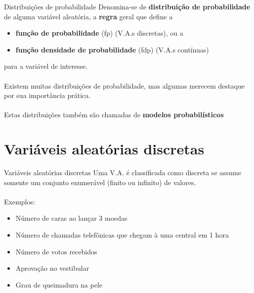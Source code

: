 \documentclass[10pt]{beamer}\usepackage[]{graphicx}\usepackage[]{color}
\theoremstyle{definition}
\begin{document}
\begin{frame}[fragile=singleslide]{Distribuições de probabilidade}
Denomina-se de \textbf{distribuição de probabilidade} de alguma variável
aleatória, a \textbf{regra} geral que define a
\begin{itemize}
\item \textbf{função de probabilidade} (fp) (V.A.s discretas), ou a
\item \textbf{função densidade de probabilidade} (fdp) (V.A.s contínuas)
\end{itemize}
para a variável de interesse. \\~\\
Existem muitas distribuições de probabilidade, mas algumas merecem
destaque por sua importância prática.\\~\\
Estas distribuições também são chamadas de \textbf{modelos
  probabilísticos}
\end{frame}



\section[V.A.s Discretas]{Variáveis aleatórias discretas}

\begin{frame}[fragile=singleslide]{Variáveis aleatórias discretas}
  Uma V.A. é classificada como discreta se assume somente um conjunto
  enumerável (finito ou infinito) de valores. \\~\\
  Exemplos:
  \begin{itemize}
  \item Número de caras ao lançar 3 moedas
  \item Número de chamadas telefônicas que chegam à uma central em 1 hora
  \item Número de votos recebidos
  \item Aprovação no vestibular
  \item Grau de queimadura na pele
  \end{itemize}

\end{frame}
\end{document}
